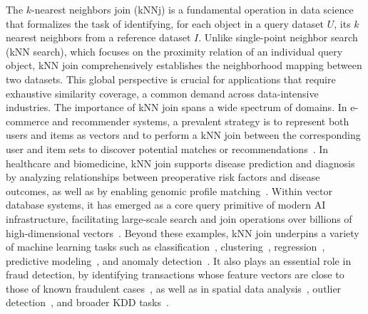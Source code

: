 The $k$-nearest neighbors join (kNNj) is a fundamental operation in data science that formalizes the task of identifying, for each object in a query dataset $U$, its $k$ nearest neighbors from a reference dataset $I$. Unlike single-point neighbor search (kNN search), which focuses on the proximity relation of an individual query object, kNN join comprehensively establishes the neighborhood mapping between two datasets. This global perspective is crucial for applications that require exhaustive similarity coverage, a common demand across data-intensive industries. The importance of kNN join spans a wide spectrum of domains. In e-commerce and recommender systems, a prevalent strategy is to represent both users and items as vectors and to perform a kNN join between the corresponding user and item sets to discover potential matches or recommendations~\cite{hu2021efficient, yang2014continuous, ahuja2019movie}. In healthcare and biomedicine, kNN join supports disease prediction and diagnosis by analyzing relationships between preoperative risk factors and disease outcomes, as well as by enabling genomic profile matching~\cite{bhatti2021predictive, deekshatulu2013classification, khateeb2017efficient, tayeb2017toward}. Within vector database systems, it has emerged as a core query primitive of modern AI infrastructure, facilitating large-scale search and join operations over billions of high-dimensional vectors~\cite{pan2024vector, pan2024survey}. Beyond these examples, kNN join underpins a variety of machine learning tasks such as classification~\cite{bijalwan2014knn, deng2016efficient, dasarathy1991nearest, zhang2017efficient}, clustering~\cite{yang2016fault, shi2018adaptive, hartigan1979algorithm, kanungo2002efficient}, regression~\cite{kohli2020sales}, predictive modeling~\cite{jawthari2021predicting, baashar2021predicting}, and anomaly detection~\cite{li2007network, tian2014anomaly, wang2020log}. It also plays an essential role in fraud detection, by identifying transactions whose feature vectors are close to those of known fraudulent cases~\cite{al2021financial, li2023artificial, singhai2023novel, aldosari2024garra}, as well as in spatial data analysis~\cite{bohm2004k, xia2004gorder, yu2007efficient}, outlier detection~\cite{ghoting2008fast, ning2018parameter}, and broader KDD tasks~\cite{bohm2004k}.

